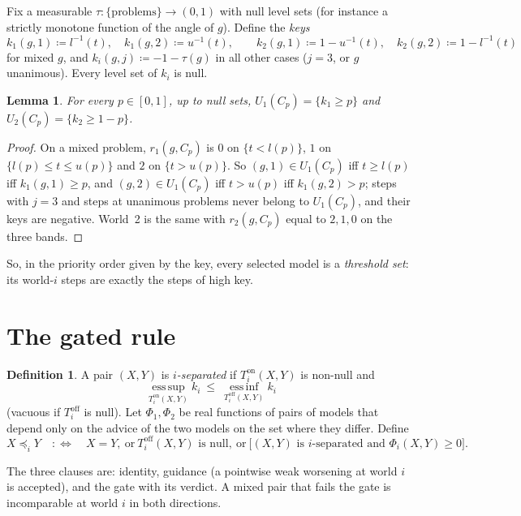 \documentclass[11pt]{article}
\newtheorem{lemma}[theorem]{Lemma}
\theoremstyle{definition}\newtheorem{definition}[theorem]{Definition}
\theoremstyle{remark}\newtheorem{remark}[theorem]{Remark}
\newcommand{\on}{\mathrm{on}}
\newcommand{\off}{\mathrm{off}}
\newcommand{\esssup}{\operatorname*{ess\,sup}}
\newcommand{\essinf}{\operatorname*{ess\,inf}}
\begin{document}
Fix a measurable $\tau\colon\{\text{problems}\}\to(0,1)$ with null level sets
(for instance a strictly monotone function of the angle of $g$). Define the
\emph{keys}
\[
 k_1(g,1)\coloneqq l^{-1}(t),\quad k_1(g,2)\coloneqq u^{-1}(t),\qquad
 k_2(g,1)\coloneqq 1-u^{-1}(t),\quad k_2(g,2)\coloneqq 1-l^{-1}(t)
\]
for mixed $g$, and $k_i(g,j)\coloneqq-1-\tau(g)$ in all other cases ($j=3$, or
$g$ unanimous). Every level set of $k_i$ is null.

\begin{lemma}\label{lem:threshold}
For every $p\in[0,1]$, up to null sets,
$U_1(C_p)=\{k_1\ge p\}$ and $U_2(C_p)=\{k_2\ge1-p\}$.
\end{lemma}
\begin{proof}
On a mixed problem, $r_1(g,C_p)$ is $0$ on $\{t<l(p)\}$, $1$ on
$\{l(p)\le t\le u(p)\}$ and $2$ on $\{t>u(p)\}$. So $(g,1)\in U_1(C_p)$ iff
$t\ge l(p)$ iff $k_1(g,1)\ge p$, and $(g,2)\in U_1(C_p)$ iff $t>u(p)$ iff
$k_1(g,2)>p$; steps with $j=3$ and steps at unanimous problems never belong to
$U_1(C_p)$, and their keys are negative. World~2 is the same with
$r_2(g,C_p)$ equal to $2,1,0$ on the three bands.
\end{proof}

So, in the priority order given by the key, every selected model is a
\emph{threshold set}: its world-$i$ steps are exactly the steps of high key.

\section{The gated rule}\label{sec:rule}

\begin{definition}\label{def:rule}
A pair $(X,Y)$ is \emph{$i$-separated} if $T^\on_i(X,Y)$ is non-null and
\[
 \esssup_{T^\on_i(X,Y)}k_i\ \le\ \essinf_{T^\off_i(X,Y)}k_i
\]
(vacuous if $T^\off_i$ is null). Let $\Phi_1,\Phi_2$ be real functions of
pairs of models that depend only on the advice of the two models on the set
where they differ. Define
\[
 X\preceq_iY\quad:\Longleftrightarrow\quad X=Y,\ \text{or}\ T^\off_i(X,Y)
 \text{ is null},\ \text{or}\ \bigl[(X,Y)\text{ is $i$-separated and }
 \Phi_i(X,Y)\ge0\bigr].
\]
\end{definition}

The three clauses are: identity, guidance (a pointwise weak worsening at world
$i$ is accepted), and the gate with its verdict. A mixed pair that fails the
gate is incomparable at world $i$ in both directions.
\end{document}
